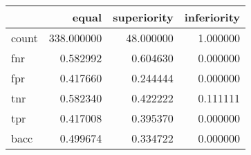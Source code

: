 \begin{tabular}{lrrr}
\toprule
{} &       equal &  superiority &  inferiority \\
\midrule
count &  338.000000 &    48.000000 &     1.000000 \\
fnr   &    0.582992 &     0.604630 &     0.000000 \\
fpr   &    0.417660 &     0.244444 &     0.000000 \\
tnr   &    0.582340 &     0.422222 &     0.111111 \\
tpr   &    0.417008 &     0.395370 &     0.000000 \\
bacc  &    0.499674 &     0.334722 &     0.000000 \\
\bottomrule
\end{tabular}
